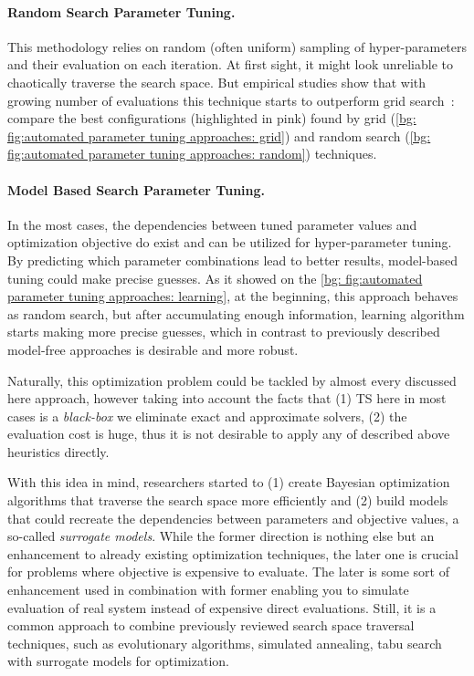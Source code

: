 \paragraph{Random Search Parameter Tuning.} This methodology relies on random (often uniform) sampling of hyper-parameters and their evaluation on each iteration. At first sight, it might look unreliable to chaotically traverse the search space. But empirical studies show that with growing number of evaluations this technique starts to outperform grid search~\cite{bergstra2012random}: compare the best configurations (highlighted in pink) found by grid (\cref{bg: fig:automated parameter tuning approaches: grid}) and random search (\cref{bg: fig:automated parameter tuning approaches: random}) techniques.

\paragraph{Model Based Search Parameter Tuning.} In the most cases, the dependencies between tuned parameter values and optimization objective do exist and can be utilized for hyper-parameter tuning. By predicting which parameter combinations lead to better results, model-based tuning could make precise guesses. As it showed on the \cref{bg: fig:automated parameter tuning approaches: learning}, at the beginning, this approach behaves as random search, but after accumulating enough information, learning algorithm starts making more precise guesses, which in contrast to previously described model-free approaches is desirable and more robust.

Naturally, this optimization problem could be tackled by almost every discussed here approach, however taking into account the facts that (1) TS here in most cases is a \textit{black-box} we eliminate exact and approximate solvers, (2) the evaluation cost is huge, thus it is not desirable to apply any of described above heuristics directly.

With this idea in mind, researchers started to (1) create  Bayesian optimization algorithms that traverse the search space more efficiently and (2) build models that could recreate the dependencies between parameters and objective values, a so-called \textit{surrogate models}. While the former direction is nothing else but an enhancement to already existing optimization techniques, the later one is crucial for problems where objective is expensive to evaluate.
The later is some sort of enhancement used in combination with former enabling you to simulate evaluation of real system instead of expensive direct evaluations. Still, it is a common approach to combine previously reviewed search space traversal techniques, such as evolutionary algorithms, simulated annealing, tabu search with surrogate models for optimization.


